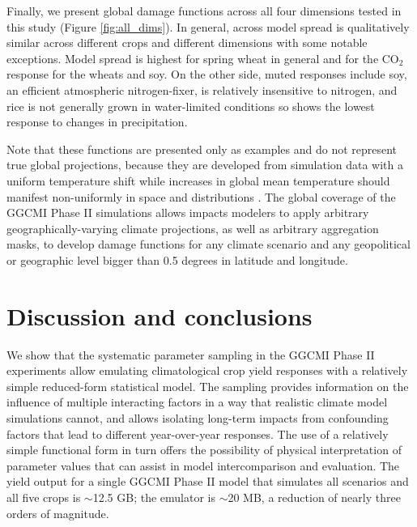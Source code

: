 \documentclass[gmd, manuscript]{copernicus} %
\begin{document}
Finally, we present global damage functions across all four dimensions tested in this study (Figure \ref{fig:all_dims}). 
In general, across model spread is qualitatively similar across different crops and different dimensions with some notable exceptions. 
Model spread is highest for spring wheat in general and for the CO$_2$ response for the wheats and soy.
On the other side, muted responses include soy, an efficient atmospheric nitrogen-fixer, is relatively insensitive to nitrogen, and rice is not generally grown in water-limited conditions so shows the lowest response to changes in precipitation. 

Note that these functions are presented only as examples and do not represent true global projections, because they are developed from simulation data with a uniform temperature shift while increases in global mean temperature should manifest non-uniformly in space and distributions \citep[e.g]{Sippel2015}. 
The global coverage of the GGCMI Phase II simulations allows impacts modelers to apply arbitrary geographically-varying climate projections, as well as arbitrary aggregation masks, to develop damage functions for any climate scenario and any geopolitical or geographic level bigger than 0.5 degrees in latitude and longitude.


\section{Discussion and conclusions} 
\label{S:6}
We show that the systematic parameter sampling in the GGCMI Phase II experiments allow emulating climatological crop yield responses with a relatively simple reduced-form statistical model. 
The sampling provides information on the influence of multiple interacting factors in a way that realistic climate model simulations cannot, and allows isolating long-term impacts from confounding factors that lead to different year-over-year responses. 
The use of a relatively simple functional form in turn offers the possibility of physical interpretation of parameter values that can assist in model intercomparison and evaluation. 
The yield output for a single GGCMI Phase II model that simulates all scenarios and all five crops is $\sim$12.5 GB; the emulator is $\sim$20 MB, a reduction of nearly three orders of magnitude. 
\end{document}
